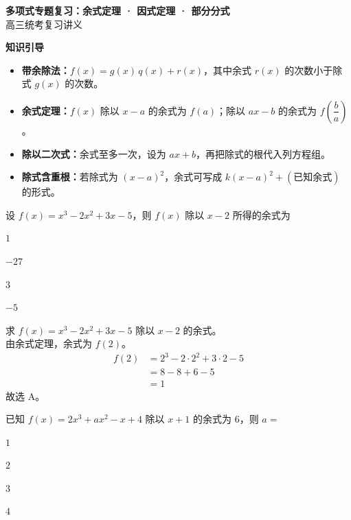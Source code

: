 \documentclass{exam-zh}
\begin{document}
\begin{center}
  {\LARGE\bfseries 多项式专题复习：余式定理 · 因式定理 · 部分分式}\\[4pt]
  {\large 高三统考复习讲义}
\end{center}

\vspace{1em}


\medskip
\noindent\textbf{知识引导}
\begin{itemize}
  \item \textbf{带余除法：}$f(x)=g(x)\,q(x)+r(x)$，其中余式 $r(x)$ 的次数小于除式 $g(x)$ 的次数。
  \item \textbf{余式定理：}$f(x)$ 除以 $x-a$ 的余式为 $f(a)$；除以 $ax-b$ 的余式为 $f\!\left(\dfrac{b}{a}\right)$。
  \item \textbf{除以二次式：}余式至多一次，设为 $ax+b$，再把除式的根代入列方程组。
  \item \textbf{除式含重根：}若除式为 $(x-a)^2$，余式可写成 $k(x-a)^2+(\text{已知余式})$ 的形式。
\end{itemize}

\setcounter{question}{0}

\begin{question}
    设 $f(x)=x^3-2x^2+3x-5$，则 $f(x)$ 除以 $x-2$ 所得的余式为 \paren[A]
    \begin{choices}
        \item $1$
        \item $-27$
        \item $3$
        \item $-5$
    \end{choices}
\end{question}

\begin{solution}
    求 $f(x)=x^3-2x^2+3x-5$ 除以 $x-2$ 的余式。 \\
    由余式定理，余式为 $f(2)$。
    \begin{align*}
        f(2) &= 2^3-2\cdot 2^2+3\cdot 2-5 \\
        &= 8-8+6-5 \\
        &= 1
    \end{align*}
    故选 A。
\end{solution}

\begin{question}
    已知 $f(x)=2x^3+ax^2-x+4$ 除以 $x+1$ 的余式为 $6$，则 $a=$ \paren[C]
    \begin{choices}
        \item $1$
        \item $2$
        \item $3$
        \item $4$
    \end{choices}
\end{question}
\end{document}
